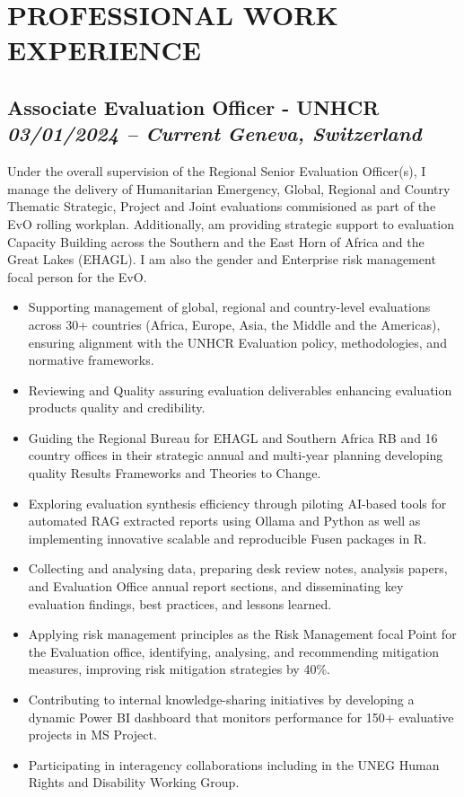 \documentclass[
  10pt,
]{article}
\providecommand{\tightlist}{%
  \setlength{\itemsep}{0pt}\setlength{\parskip}{0pt}}
\begin{document}
\vspace{0.5cm}

\section{PROFESSIONAL WORK EXPERIENCE}\label{work-experience}

\subsection{\texorpdfstring{Associate Evaluation Officer - UNHCR
\emph{03/01/2024 -- Current} \textbar{} \emph{Geneva, Switzerland}}{Associate Evaluation Officer - UNHCR 03/01/2024 -- Current \textbar{} Geneva, Switzerland}}\label{associate-evaluation-officer---unhcr-03012024-current-geneva-switzerland}

Under the overall supervision of the Regional Senior Evaluation Officer(s), I manage the delivery of Humanitarian Emergency, Global, Regional and Country Thematic Strategic, Project and Joint evaluations commisioned as part of the EvO rolling workplan. Additionally, am providing strategic support to evaluation Capacity Building across the Southern and the East Horn of Africa and the Great Lakes (EHAGL). I am also the gender and Enterprise risk management focal person for the EvO.

\begin{itemize}
\tightlist
\item
Supporting management of global, regional and country-level evaluations across 30+ countries (Africa, Europe, Asia, the Middle and the Americas), ensuring alignment with the UNHCR Evaluation policy, methodologies, and normative frameworks.
\item
Reviewing and Quality assuring evaluation deliverables enhancing evaluation products quality and credibility.
\item
Guiding the Regional Bureau for EHAGL and Southern Africa RB and 16 country offices in their strategic annual and multi-year planning developing quality Results Frameworks and Theories to Change.
\item
Exploring evaluation synthesis efficiency through piloting AI-based tools for automated RAG extracted reports using Ollama and Python as well as implementing innovative scalable and reproducible Fusen packages in R.
\item
Collecting and analysing data, preparing desk review notes, analysis papers, and Evaluation Office annual report sections, and disseminating key evaluation findings, best practices, and lessons learned.
\item
Applying risk management principles as the Risk Management focal Point for the Evaluation office, identifying, analysing, and recommending mitigation measures, improving risk mitigation strategies by 40\%.
\item
Contributing to internal knowledge-sharing initiatives by developing a dynamic Power BI dashboard that monitors performance for 150+ evaluative projects in MS Project.
\item
Participating in interagency collaborations including in the UNEG Human Rights and Disability Working Group.
\end{itemize}
\end{document}
